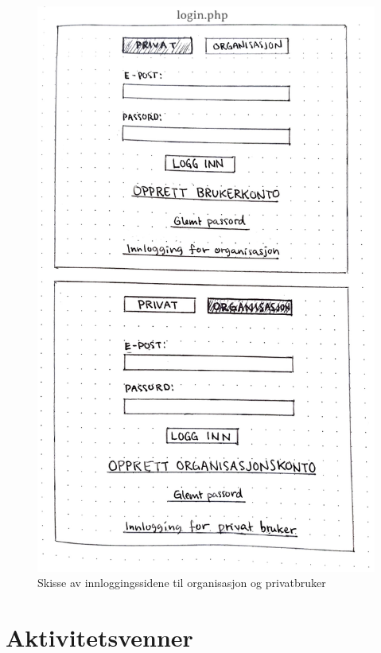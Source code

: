 \begin{figure}[H]
\centering
\includegraphics[width=.7\textwidth]{Illustrasjoner/Skisser/1.0/1-18-innlogging.jpg}
\caption{Skisse av innloggingssidene til organisasjon og privatbruker}
\label{vedlegg:1-18-innlogging}
\end{figure}

\section{Aktivitetsvenner}

